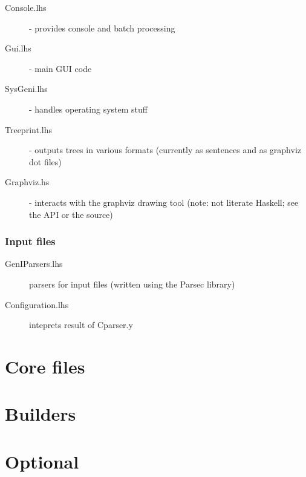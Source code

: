 \documentclass[a4paper,11pt]{report}
\begin{document}
\begin{description}
 \item[Console.lhs] - provides console and batch processing
 \item[Gui.lhs] - main GUI code 
 \item[SysGeni.lhs] - handles operating system stuff
 \item[Treeprint.lhs] - outputs trees in various formats 
                        (currently as sentences and as graphviz dot
                        files)
 \item[Graphviz.hs] - interacts with the graphviz drawing tool (note:
                      not literate Haskell; see the API or the source)
\end{description}

\section{Input files}

\begin{description}
 \item[GenIParsers.lhs] parsers for input files (written using the
 Parsec library)
 \item[Configuration.lhs] inteprets result of Cparser.y
\end{description}





\part{Core files}

       
       
       
       

\part{Builders}

       
       
       

\part{Optional}
\end{document}
